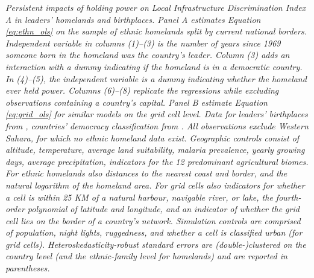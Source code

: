 \documentclass[11pt, oneside]{article}   	%
\newcommand{\mysubcaption}[1]{
\justify
\begin{spacing}{0.7}
\textit{\footnotesize #1}
\end{spacing}}
\begin{document}
\begin{table}[!t]
\mysubcaption{Persistent impacts of holding power on Local Infrastructure Discrimination Index $\Lambda$ in leaders' homelands and birthplaces. Panel A estimates Equation \eqref{eq:ethn_ols} on the sample of ethnic homelands split by current national borders. Independent variable in columns (1)--(3) is the number of years since 1969 someone born in the homeland was the country's leader. Column (3) adds an interaction with a dummy indicating if the homeland is in a democratic country. In (4)--(5), the independent variable is a dummy indicating whether the homeland ever held power. Columns (6)--(8) replicate the regressions while excluding observations containing a country's capital. Panel B estimate Equation \eqref{eq:grid_ols} for similar models on the grid cell level. Data for leaders' birthplaces from \cite{Dreher_AiddemandAfrican_2016}, countries' democracy classification from \cite{Marshall_PolityProjectCenter_2015}. All observations exclude Western Sahara, for which no ethnic homeland data exist. Geographic controls consist of altitude, temperature, average land suitability, malaria prevalence, yearly growing days, average precipitation, indicators for the 12 predominant agricultural biomes. For ethnic homelands also distances to the nearest coast and border, and the natural logarithm of the homeland area. For grid cells also indicators for whether a cell is within 25 KM of a natural harbour, navigable river, or lake, the fourth-order polynomial of latitude and longitude, and an indicator of whether the grid cell lies on the border of a country's network. Simulation controls are comprised of population, night lights, ruggedness, and whether a cell is classified urban (for grid cells). Heteroskedasticity-robust standard errors are (double-)clustered on the country level (and the ethnic-family level for homelands) and are reported in parentheses.}
\end{table}
\end{document}
